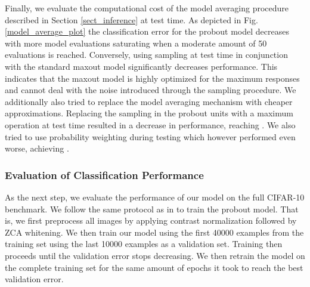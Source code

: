 \documentclass{article} \pdfoutput=1
\begin{document}
Finally, we evaluate the computational cost of the model averaging
procedure described in Section \ref{sect_inference} at test time. As
depicted in Fig. \ref{model_average_plot} the classification error for
the probout model decreases with more model evaluations saturating
when a moderate amount of 50 evaluations is reached. Conversely, using
sampling at test time in conjunction with the standard maxout model
significantly decreases performance. This indicates that the maxout
model is highly optimized for the maximum responses and cannot deal
with the noise introduced through the sampling procedure.  We
additionally also tried to replace the model averaging mechanism with
cheaper approximations. Replacing the sampling in the probout units
with a maximum operation at test time resulted in a decrease in
performance, reaching .  We also tried to use probability
weighting during testing \cite{ZeilerStochastic2013} which however
performed even worse, achieving .

\subsubsection{Evaluation of Classification Performance}
As the next step, we evaluate the performance of our model on the full
CIFAR-10 benchmark.  We follow the same protocol as in
\cite{Goodfellow2013} to train the probout model. That is, we first
preprocess all images by applying contrast normalization followed by
ZCA whitening. We then train our model using the first 40000 examples
from the training set using the last 10000 examples as a validation
set. Training then proceeds until the validation error stops
decreasing. We then retrain the model on the complete training set for
the same amount of epochs it took to reach the best validation error.
\end{document}
